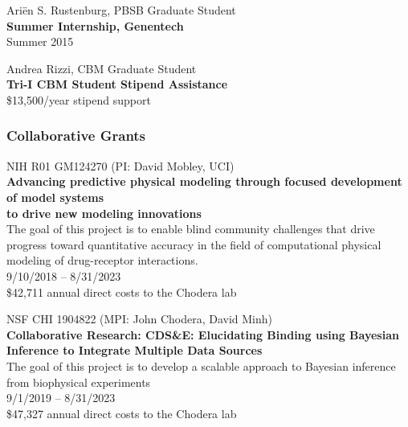 \documentclass[10pt]{article}
\begin{document}
\vspace{1.5ex}

Ari\"{e}n S. Rustenburg, PBSB Graduate Student\\
{\bf Summer Internship, Genentech}\\
Summer 2015

\vspace{1.5ex}

Andrea Rizzi, CBM Graduate Student\\
{\bf Tri-I CBM Student Stipend Assistance}\\
\$13,500/year stipend support

\color{black}

\subsubsection*{Collaborative Grants}

NIH R01 GM124270 (PI: David Mobley, UCI) \\
{\bf Advancing predictive physical modeling through focused development of model systems\\ to drive new modeling innovations}\\
The goal of this project is to enable blind community challenges that drive progress toward quantitative accuracy in the field of computational physical modeling of drug-receptor interactions.\\
9/10/2018 -- 8/31/2023\\
\$42,711 annual direct costs to the Chodera lab

\vspace{1.5ex}

NSF CHI 1904822 (MPI: John Chodera, David Minh) \\
{\bf Collaborative Research: CDS\&E: Elucidating Binding using Bayesian Inference to Integrate Multiple Data Sources}\\
The goal of this project is to develop a scalable approach to Bayesian inference from biophysical experiments\\
9/1/2019 -- 8/31/2023\\
\$47,327 annual direct costs to the Chodera lab

\vspace{1.5ex}
\end{document}
